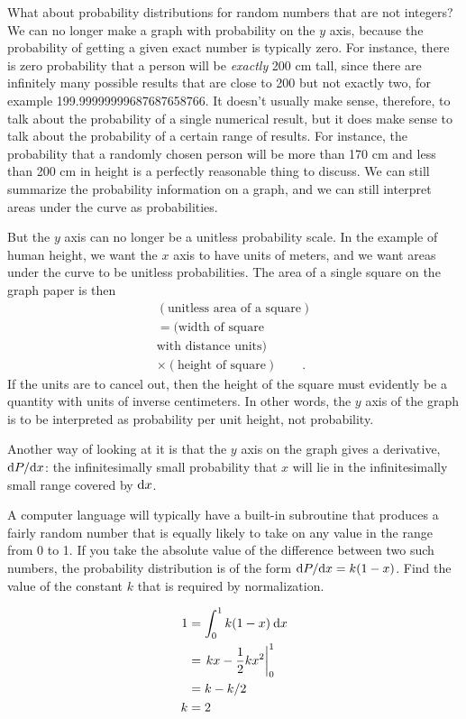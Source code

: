 What about probability distributions for random numbers that
are not integers? We can no longer make a graph with
probability on the $y$ axis, because the probability of
getting a given exact number is typically zero. For
instance, there is zero probability that a person will be
\emph{exactly} 200 cm tall, since there are
infinitely many possible results that are close to 200 but not
exactly two, for example 199.99999999687687658766.
It doesn't usually make sense, therefore, to talk
about the probability of a single numerical result, but it
does make sense to talk about the probability of a certain
range of results. For instance, the probability that a randomly
chosen person will be more than 170 cm and less than 200 cm
in height is a perfectly
reasonable thing to discuss. We can still summarize the
probability information on a graph, and we can still
interpret areas under the curve as probabilities.
%

But the $y$ axis can no longer be a unitless probability
scale. In the example of human height, we want the $x$
axis to have units of meters, and we want areas under the
curve to be unitless probabilities. The area of a single
square on the graph paper is then
\begin{align*}
 (\text{unitless area of a square})\\
         =  (\text{width of square}\\
             \text{with distance units}) \\
             \times (\text{height of square}) \qquad .
\end{align*}
If the units are to cancel out, then the height of the
square must evidently be a quantity with units of inverse
centimeters. In other words, the $y$ axis of the graph is to be
interpreted as probability per unit height, not probability.

Another way of looking at it is that the $y$ axis on the graph
gives a derivative, $\textup{d} P/\textup{d} x$: the infinitesimally small
probability that $x$ will lie in the infinitesimally small
range covered by $\textup{d} x$.

\begin{eg}\label{eg:random-diff}
\egquestion A computer language will typically have a built-in
subroutine that produces a fairly random number that is equally
likely to take on any value in the range from 0 to 1. If you
take the absolute value of the difference between two such
numbers, the probability distribution is of the form
$\textup{d} P/\textup{d} x=k(1-x)$. Find the value of the constant $k$
that is required by normalization.

\eganswer
\begin{align*}
  1 &= \int_0^1 k(1-x)\:\textup{d} x \\
    &= \left.kx-\frac{1}{2}kx^2\right|_0^1 \\
    &= k-k/2 \\
  k &= 2
\end{align*}
\end{eg}

